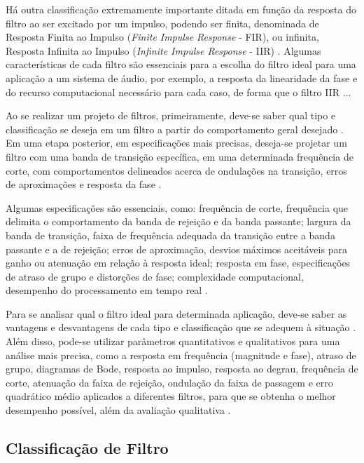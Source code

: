 Há outra classificação extremamente importante ditada em função da resposta do filtro ao ser excitado por um impulso, podendo ser finita, denominada de Resposta Finita ao Impulso (\textit{Finite Impulse Response} - FIR), ou infinita, Resposta Infinita ao Impulso (\textit{Infinite Impulse Response} - IIR) \cite{oppenheim2013processamento}. Algumas características de cada filtro são essenciais para a escolha do filtro ideal para uma aplicação a um sistema de áudio, por exemplo, a resposta da linearidade da fase e do recurso computacional necessário para cada caso, de forma que o filtro IIR \cite{oppenheim2013processamento}...

Ao se realizar um projeto de filtros, primeiramente, deve-se saber qual tipo e classificação se deseja em um filtro a partir do comportamento geral desejado \cite{oppenheim2013processamento}. Em uma etapa posterior, em especificações mais precisas, deseja-se projetar um filtro com uma banda de transição específica, em uma determinada frequência de corte, com comportamentos delineados acerca de ondulações na transição, erros de aproximações e resposta da fase \cite{oppenheim2013processamento}.

Algumas especificações são essenciais, como: frequência de corte, frequência que delimita o comportamento da banda de rejeição e da banda passante; largura da banda de transição, faixa de frequência adequada da transição entre a banda passante e a de rejeição; erros de aproximação, desvios máximos aceitáveis para ganho ou atenuação em relação à resposta ideal; resposta em fase, especificações de atraso de grupo e distorções de fase; complexidade computacional, desempenho do processamento em tempo real \cite{oppenheim2013processamento}.

Para se analisar qual o filtro ideal para determinada aplicação, deve-se saber as vantagens e desvantagens de cada tipo e classificação que se adequem à situação \cite{oppenheim2013processamento}. Além disso, pode-se utilizar parâmetros quantitativos e qualitativos para uma análise mais precisa, como a resposta em frequência (magnitude e fase), atraso de grupo, diagramas de Bode, resposta ao impulso, resposta ao degrau, frequência de corte, atenuação da faixa de rejeição, ondulação da faixa de passagem e erro quadrático médio aplicados a diferentes filtros, para que se obtenha o melhor desempenho possível, além da avaliação qualitativa \cite{oppenheim2013processamento}.

\subsection[short]{Classificação de Filtro}
